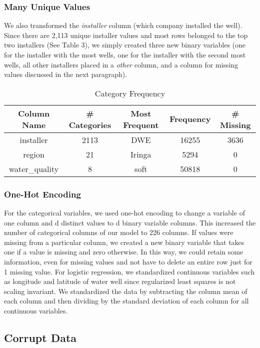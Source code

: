 \documentclass[10pt]{SelfArx} %
\begin{document}
\subsubsection{Many Unique Values}

We also transformed the \textit{installer} column (which company installed the well). Since there are 2,113 unique installer values and most rows belonged to the top two installers (See Table 3), we simply created three new binary variables (one for the installer with the most wells, one for the installer with the second most wells, all other installers placed in a \textit{other} column, and a column for missing values discussed in the next paragraph).
\break

\begin{table*}[t]
  \centering
\caption{Category Frequency}
\begin{tabular}{ |c|c|c|c|c| }
      \hline
      Column Name & \# Categories & Most Frequent & Frequency & \# Missing\\
      \hline
      \hline
      installer & 2113 & DWE & 16255 & 3636\\
      region & 21 & Iringa & 5294 & 0\\
      water\_quality & 8 & soft & 50818 & 0\\
      \hline
    \end{tabular}
  \label{tab:3}
\end{table*}

\subsubsection{One-Hot Encoding}

For the categorical variables, we used one-hot encoding to change a variable of one column and d distinct values to d binary variable columns. This increased the number of categorical columns of our model to 226 columns. If values were missing from a particular column, we created a new binary variable that takes one if a value is missing and zero otherwise. In this way, we could retain some information, even for missing values and not have to delete an entire row just for 1 missing value.  For logistic regression, we standardized continuous variables such as longitude and latitude of water well since regularized least squares is not scaling invariant. We standardized the data by subtracting the column mean of each column and then dividing by the standard deviation of each column for all continuous variables.

\subsection{Corrupt Data}
\end{document}
